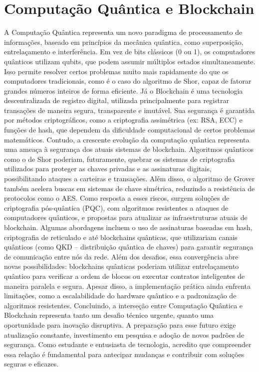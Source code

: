 \documentclass[12pt,a4paper]{article}
\begin{document}
    \section{Computação Quântica e Blockchain} 
      A Computação Quântica representa um novo paradigma de processamento de informações, baseado em princípios da mecânica quântica, como superposição, entrelaçamento e 
    interferência. Em vez de bits clássicos (0 ou 1), os computadores quânticos utilizam qubits, que podem assumir múltiplos estados simultaneamente. Isso permite resolver
    certos problemas muito mais rapidamente do que os computadores tradicionais, como é o caso do algoritmo de Shor, capaz de fatorar grandes números inteiros de forma eficiente.
    Já o Blockchain é uma tecnologia descentralizada de registro digital, utilizada principalmente para registrar transações de maneira segura, transparente e imutável.
    Sua segurança é garantida por métodos criptográficos, como a criptografia assimétrica (ex: RSA, ECC) e funções de hash, que dependem da dificuldade computacional de certos problemas matemáticos.
    Contudo, a crescente evolução da computação quântica representa uma ameaça à segurança dos atuais sistemas de blockchain. Algoritmos quânticos como o de Shor poderiam,
    futuramente, quebrar os sistemas de criptografia utilizados para proteger as chaves privadas e as assinaturas digitais, possibilitando ataques a carteiras e transações.
      Além disso, o algoritmo de Grover também acelera buscas em sistemas de chave simétrica, reduzindo a resistência de protocolos como o AES. Como resposta a esses riscos, 
    surgem soluções de criptografia pós-quântica (PQC), com algoritmos resistentes a ataques de computadores quânticos, 
    e propostas para atualizar as infraestruturas atuais de blockchain. Algumas abordagens incluem o uso de assinaturas baseadas em hash, criptografia de reticulado e até 
    blockchains quânticas, que utilizariam canais quânticos (como QKD – distribuição quântica de chaves) para garantir segurança de comunicação entre nós da rede.
    Além dos desafios, essa convergência abre novas possibilidades: blockchains quânticas poderiam utilizar entrelaçamento quântico para verificar a ordem de blocos ou executar contratos inteligentes de maneira paralela e segura. Apesar disso, a implementação prática ainda enfrenta limitações, como a escalabilidade do hardware quântico e a padronização de algoritmos resistentes.
      Concluindo, a interseção entre Computação Quântica e Blockchain representa tanto um desafio técnico urgente, quanto uma oportunidade para inovação disruptiva.
    A preparação para esse futuro exige atualização constante, investimento em pesquisa e adoção de novos padrões de segurança. Como estudante e entusiasta de tecnologia,
     acredito que compreender essa relação é fundamental para antecipar mudanças e contribuir com soluções seguras e eficazes.




    \subsection{}

\clearpage


\end{document}
